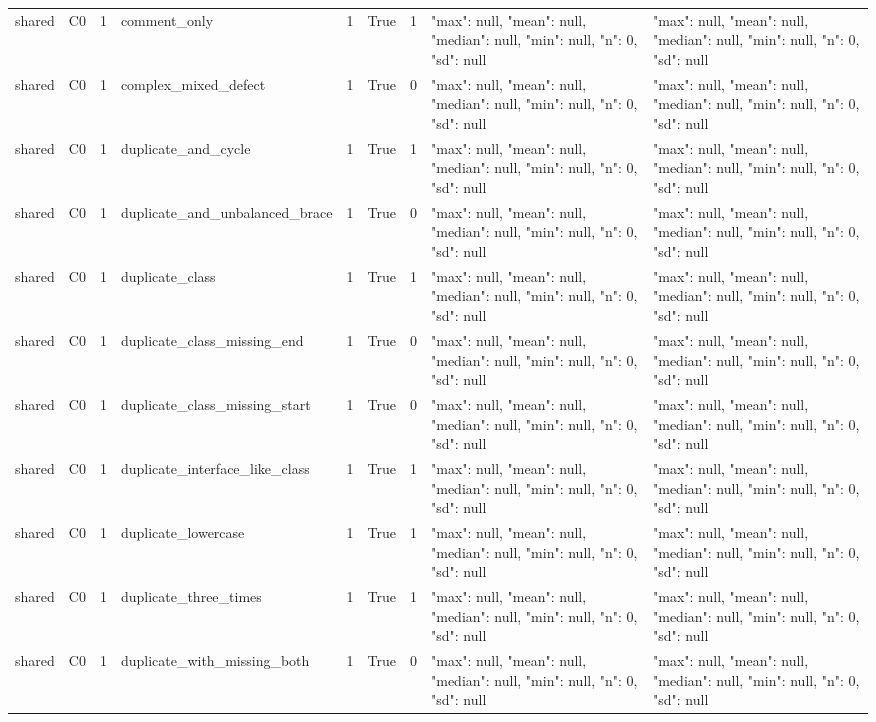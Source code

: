 \begin{tabular}{lllllllll}
shared & C0 & 1 & comment\_only & 1 & True & 1 & {"max": null, "mean": null, "median": null, "min": null, "n": 0, "sd": null} & {"max": null, "mean": null, "median": null, "min": null, "n": 0, "sd": null} \\
shared & C0 & 1 & complex\_mixed\_defect & 1 & True & 0 & {"max": null, "mean": null, "median": null, "min": null, "n": 0, "sd": null} & {"max": null, "mean": null, "median": null, "min": null, "n": 0, "sd": null} \\
shared & C0 & 1 & duplicate\_and\_cycle & 1 & True & 1 & {"max": null, "mean": null, "median": null, "min": null, "n": 0, "sd": null} & {"max": null, "mean": null, "median": null, "min": null, "n": 0, "sd": null} \\
shared & C0 & 1 & duplicate\_and\_unbalanced\_brace & 1 & True & 0 & {"max": null, "mean": null, "median": null, "min": null, "n": 0, "sd": null} & {"max": null, "mean": null, "median": null, "min": null, "n": 0, "sd": null} \\
shared & C0 & 1 & duplicate\_class & 1 & True & 1 & {"max": null, "mean": null, "median": null, "min": null, "n": 0, "sd": null} & {"max": null, "mean": null, "median": null, "min": null, "n": 0, "sd": null} \\
shared & C0 & 1 & duplicate\_class\_missing\_end & 1 & True & 0 & {"max": null, "mean": null, "median": null, "min": null, "n": 0, "sd": null} & {"max": null, "mean": null, "median": null, "min": null, "n": 0, "sd": null} \\
shared & C0 & 1 & duplicate\_class\_missing\_start & 1 & True & 0 & {"max": null, "mean": null, "median": null, "min": null, "n": 0, "sd": null} & {"max": null, "mean": null, "median": null, "min": null, "n": 0, "sd": null} \\
shared & C0 & 1 & duplicate\_interface\_like\_class & 1 & True & 1 & {"max": null, "mean": null, "median": null, "min": null, "n": 0, "sd": null} & {"max": null, "mean": null, "median": null, "min": null, "n": 0, "sd": null} \\
shared & C0 & 1 & duplicate\_lowercase & 1 & True & 1 & {"max": null, "mean": null, "median": null, "min": null, "n": 0, "sd": null} & {"max": null, "mean": null, "median": null, "min": null, "n": 0, "sd": null} \\
shared & C0 & 1 & duplicate\_three\_times & 1 & True & 1 & {"max": null, "mean": null, "median": null, "min": null, "n": 0, "sd": null} & {"max": null, "mean": null, "median": null, "min": null, "n": 0, "sd": null} \\
shared & C0 & 1 & duplicate\_with\_missing\_both & 1 & True & 0 & {"max": null, "mean": null, "median": null, "min": null, "n": 0, "sd": null} & {"max": null, "mean": null, "median": null, "min": null, "n": 0, "sd": null} \\

\end{tabular}
